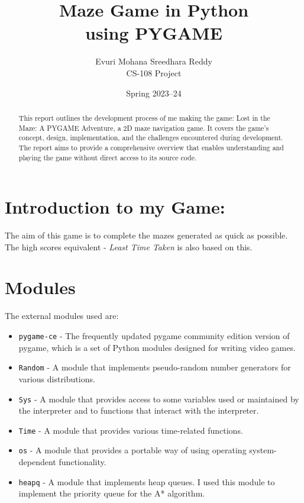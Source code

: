 \documentclass[10pt]{article}
\title{Maze Game in Python \\ using PYGAME}
\author{Evuri Mohana Sreedhara Reddy \\ CS-108 Project}
\date{Spring 2023--24}
\begin{document}
    \maketitle

    \begin{abstract}
        This report outlines the development process of me making the game: Lost in the Maze: A PYGAME Adventure, a 2D maze navigation game.
        It covers the game's concept, design, implementation, and the challenges encountered during development.
        The report aims to provide a comprehensive overview that enables understanding and playing the game without direct access to its source code.
    \end{abstract}

    \tableofcontents
    \newpage


    \section{Introduction to my Game:}\label{sec:introduction}
    The aim of this game is to complete the mazes generated as quick as possible.
    The high scores equivalent - \emph{Least Time Taken} is also based on this.


    \section{Modules}\label{sec:modules}
    The external modules used are:
    \begin{itemize}
        \item \texttt{pygame-ce} - The frequently updated pygame community edition version of pygame, which is a set of Python modules designed for writing video games.
        \item \texttt{Random} - A module that implements pseudo-random number generators for various distributions.
        \item \texttt{Sys} - A module that provides access to some variables used or maintained by the interpreter and to functions that interact with the interpreter.
        \item \texttt{Time} - A module that provides various time-related functions.
        \item \texttt{os} - A module that provides a portable way of using operating system-dependent functionality.
        \item \texttt{heapq} - A module that implements heap queues.
        I used this module to implement the priority queue for the A* algorithm.
    \end{itemize}
\end{document}
